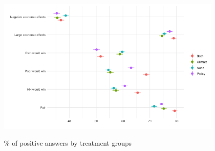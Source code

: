 \begin{frame}{}%
\begin{figure}[h!]
\caption{\% of positive answers by treatment groups} %
\includegraphics[width=.7\paperwidth]{../figures/country_comparison/attitudes_pol_by_country_all.png} \\
\end{figure}
\end{frame}

